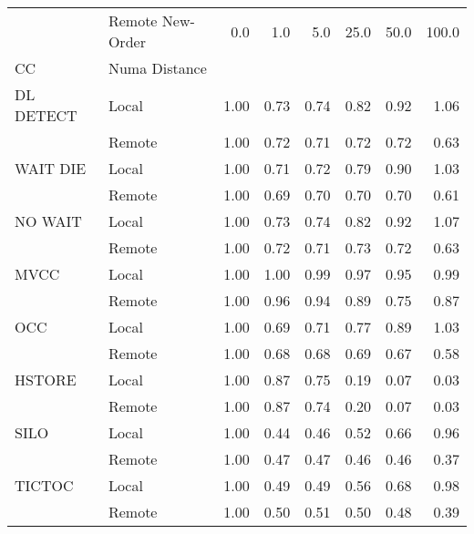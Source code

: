 \begin{tabular}{llrrrrrr}
\toprule
       & Remote New-Order &  0.0   &  1.0   &  5.0   &  25.0  &  50.0  &  100.0 \\
CC & Numa Distance &        &        &        &        &        &        \\
\midrule
DL DETECT & Local &   1.00 &   0.73 &   0.74 &   0.82 &   0.92 &   1.06 \\
       & Remote &   1.00 &   0.72 &   0.71 &   0.72 &   0.72 &   0.63 \\
WAIT DIE & Local &   1.00 &   0.71 &   0.72 &   0.79 &   0.90 &   1.03 \\
       & Remote &   1.00 &   0.69 &   0.70 &   0.70 &   0.70 &   0.61 \\
NO WAIT & Local &   1.00 &   0.73 &   0.74 &   0.82 &   0.92 &   1.07 \\
       & Remote &   1.00 &   0.72 &   0.71 &   0.73 &   0.72 &   0.63 \\
MVCC & Local &   1.00 &   1.00 &   0.99 &   0.97 &   0.95 &   0.99 \\
       & Remote &   1.00 &   0.96 &   0.94 &   0.89 &   0.75 &   0.87 \\
OCC & Local &   1.00 &   0.69 &   0.71 &   0.77 &   0.89 &   1.03 \\
       & Remote &   1.00 &   0.68 &   0.68 &   0.69 &   0.67 &   0.58 \\
HSTORE & Local &   1.00 &   0.87 &   0.75 &   0.19 &   0.07 &   0.03 \\
       & Remote &   1.00 &   0.87 &   0.74 &   0.20 &   0.07 &   0.03 \\
SILO & Local &   1.00 &   0.44 &   0.46 &   0.52 &   0.66 &   0.96 \\
       & Remote &   1.00 &   0.47 &   0.47 &   0.46 &   0.46 &   0.37 \\
TICTOC & Local &   1.00 &   0.49 &   0.49 &   0.56 &   0.68 &   0.98 \\
       & Remote &   1.00 &   0.50 &   0.51 &   0.50 &   0.48 &   0.39 \\
\bottomrule
\end{tabular}
